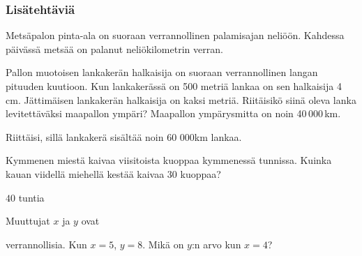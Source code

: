 \begin{tehtavasivu}
\subsubsection*{Lisätehtäviä}

\begin{tehtava}
	Metsäpalon pinta-ala on suoraan verrannollinen palamisajan neliöön. Kahdessa päivässä metsää on palanut neliökilometrin verran. 
	\begin{alakohdat}
\end{alakohdat} 
	\begin{vastaus}
		\begin{alakohdat}
\end{alakohdat} 
	\end{vastaus}
\end{tehtava}

\begin{tehtava}
Pallon muotoisen lankakerän halkaisija on suoraan verrannollinen langan pituuden kuutioon. Kun lankakerässä on 500 metriä lankaa on sen halkaisija 4 cm. Jättimäisen lankakerän halkaisija on kaksi metriä. Riitäisikö siinä oleva lanka levitettäväksi maapallon ympäri? Maapallon ympärysmitta on noin 40\,000\,km.
\begin{vastaus}
Riittäisi, sillä lankakerä sisältää noin 60 000km lankaa.
\end{vastaus}
\end{tehtava}

\begin{tehtava}
	Kymmenen miestä kaivaa viisitoista kuoppaa kymmenessä tunnissa.
	Kuinka kauan viidellä miehellä kestää kaivaa $30$ kuoppaa?	
	\begin{vastaus}
		$40$ tuntia
	\end{vastaus}
\end{tehtava}

\begin{tehtava}
	Muuttujat $x$ ja $y$ ovat
	\begin{alakohdatrivi}
		\alakohta{suoraan}
		\alakohta{kääntäen}
	\end{alakohdatrivi}
	verrannollisia. Kun $x = 5$, $y = 8$. Mikä on $y$:n arvo kun $x = 4$?
	\begin{vastaus}
		\begin{alakohdat}
			\alakohta{$\frac{32}{5}$}
			\alakohta{$10$}
		\end{alakohdat}
	\end{vastaus}
\end{tehtava}


\end{tehtavasivu}
